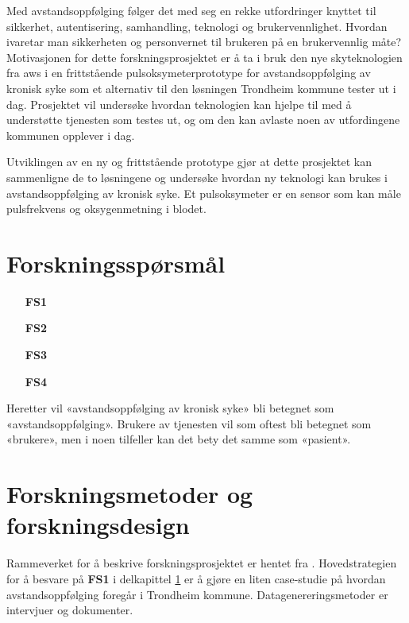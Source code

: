 Med avstandsoppfølging følger det med seg en rekke utfordringer knyttet til sikkerhet, autentisering, samhandling,
teknologi og brukervennlighet. Hvordan ivaretar man sikkerheten og personvernet til brukeren på en brukervennlig måte?
Motivasjonen for dette forskningsprosjektet er å ta i bruk den nye skyteknologien fra \gls{aws} i en frittstående
pulsoksymeterprototype for avstandsoppfølging av kronisk syke som et alternativ til den løsningen Trondheim
kommune tester ut i dag. Prosjektet vil undersøke hvordan teknologien kan hjelpe til med å understøtte tjenesten som testes ut,
og om den kan avlaste noen av utfordingene kommunen opplever i dag.

Utviklingen av en ny og frittstående prototype gjør at dette prosjektet kan sammenligne de to løsningene og undersøke hvordan ny
teknologi kan brukes i avstandsoppfølging av kronisk syke. Et pulsoksymeter er en sensor som kan måle pulsfrekvens og oksygenmetning i blodet. 

\section{Forskningsspørsmål}
\label{sec:res_questions}

\begin{enumerate}
    \item[\textbf{FS1}] 
    \item[\textbf{FS2}] 
    \item[\textbf{FS3}] 
    \item[\textbf{FS4}] 
\end{enumerate}

Heretter vil «avstandsoppfølging av kronisk syke» bli betegnet som «avstandsoppfølging». Brukere av tjenesten vil
som oftest bli betegnet som «brukere», men i noen tilfeller kan det bety det samme som «pasient».

\section{Forskningsmetoder og forskningsdesign}
Rammeverket for å beskrive forskningsprosjektet er hentet fra \citet{oates}. Hovedstrategien for å besvare på \textbf{FS1} i
delkapittel \ref{sec:res_questions} er å gjøre en liten case-studie på hvordan avstandsoppfølging foregår i Trondheim kommune. Datagenereringsmetoder
er intervjuer og dokumenter. 

